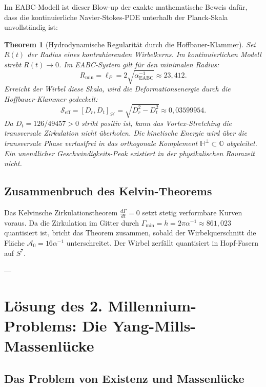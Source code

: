 \documentclass[11pt,a4paper]{article}
\newtheorem{theorem}{Theorem}[section]
\theoremstyle{definition}
\theoremstyle{remark}
\numberwithin{equation}{section}
\begin{document}
Im EABC-Modell ist dieser Blow-up der exakte mathematische Beweis dafür, dass die kontinuierliche Navier-Stokes-PDE unterhalb der Planck-Skala unvollständig ist:
\begin{theorem}[Hydrodynamische Regularität durch die Hoffbauer-Klammer]
Sei $R(t)$ der Radius eines kontrahierenden Wirbelkerns. Im kontinuierlichen Modell strebt $R(t) \to 0$. Im EABC-System gilt für den minimalen Radius:
\begin{equation}
R_{\mathrm{min}} = \ell_P = 2\sqrt{\alpha^{-1}_{\mathrm{EABC}}} \approx 23{,}412.
\end{equation}
Erreicht der Wirbel diese Skala, wird die Deformationsenergie durch die Hoffbauer-Klammer gedeckelt:
\begin{equation}
\mathcal{S}_{\mathrm{eff}} = [D_r, D_t]_{\mathcal{H}} = \sqrt{D_r^2 - D_t^2} \approx 0{,}03599954.
\end{equation}
Da $D_t = 126/49457 > 0$ strikt positiv ist, kann das Vortex-Stretching die transversale Zirkulation nicht überholen. Die kinetische Energie wird über die transversale Phase verlustfrei in das orthogonale Komplement $\mathbb{H}^\perp \subset \mathbb{O}$ abgeleitet. Ein unendlicher Geschwindigkeits-Peak existiert in der physikalischen Raumzeit nicht.
\end{theorem}

\subsection{Zusammenbruch des Kelvin-Theorems}

Das Kelvinsche Zirkulationstheorem $\frac{d\Gamma}{dt} = 0$ setzt stetig verformbare Kurven voraus. Da die Zirkulation im Gitter durch $\Gamma_{\mathrm{min}} = h = 2\pi\alpha^{-1} \approx 861{,}023$ quantisiert ist, bricht das Theorem zusammen, sobald der Wirbelquerschnitt die Fläche $\mathcal{A}_0 = 16\alpha^{-1}$ unterschreitet. Der Wirbel zerfällt quantisiert in Hopf-Fasern auf $S^7$.

---

\section{Lösung des 2. Millennium-Problems: Die Yang-Mills-Massenlücke}

\subsection{Das Problem von Existenz und Massenlücke}
\end{document}
